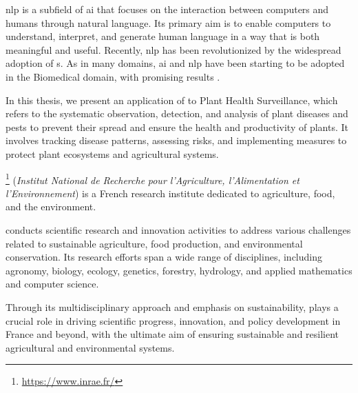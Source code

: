 \label{01_motivation}


\gls{nlp} is a subfield of \gls{ai} that focuses on the interaction between computers and humans through natural language. Its primary aim is to enable computers to understand, interpret, and generate human language in a way that is both meaningful and useful.
Recently, \gls{nlp} has been revolutionized by the widespread adoption of \neuralNetwork{}s. 
As in many domains, \gls{ai} and \gls{nlp} have been starting to be adopted in the Biomedical domain, with promising results . 



In this thesis, we present an application of \textclassification{} to Plant Health Surveillance, which refers to the systematic observation, detection, and analysis of plant diseases and pests to prevent their spread and ensure the health and productivity of plants. It involves tracking disease patterns, assessing risks, and implementing measures to protect plant ecosystems and agricultural systems.





\label{01_2_1_INRAE}

\href{https://www.inrae.fr/}{\INRAE{} }\footnote{\url{https://www.inrae.fr/}}  (\emph{Institut National de Recherche} \emph{pour l'Agriculture, l'Alimentation et l'Environnement}) is a French research institute dedicated to agriculture, food, and the environment. 

\INRAE{} conducts scientific research and innovation activities to address various challenges related to sustainable agriculture, food production, and environmental conservation. Its research efforts span a wide range of disciplines, including agronomy, biology, ecology, genetics, forestry, hydrology, and applied mathematics and computer science.

Through its multidisciplinary approach and emphasis on sustainability, \INRAE{} plays a crucial role in driving scientific progress, innovation, and policy development in France and beyond, with the ultimate aim of ensuring sustainable and resilient agricultural and environmental systems.

